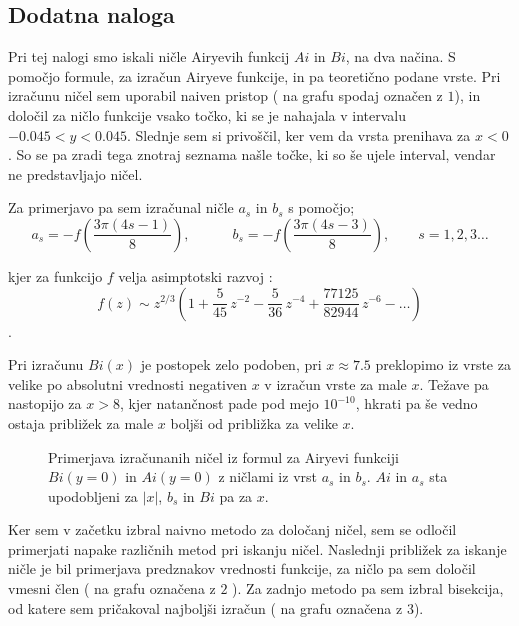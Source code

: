 \documentclass[11pt]{article}
\begin{document}
\subsection{Dodatna naloga}
Pri tej nalogi smo iskali ničle Airyevih funkcij $Ai$ in $Bi$, na dva načina. S pomočjo formule, za izračun Airyeve funkcije, in pa teoretično podane vrste. Pri izračunu ničel sem uporabil naiven pristop ( na grafu spodaj označen z $1$), in določil za ničlo funkcije vsako točko, ki se je nahajala v intervalu $-0.045 < y<0.045 $. Slednje sem si privoščil, ker vem da vrsta prenihava za $x<0$. So se pa zradi tega znotraj seznama našle točke, ki so še ujele interval, vendar ne predstavljajo ničel. 

Za primerjavo pa sem izračunal ničle $a_s$ in $b_s$ s pomočjo;
$$ a_s = -f \left ( \frac{3\pi ( 4s - 1)}{8} \right ), \quad \quad \quad  b_s =  -f \left ( \frac{3\pi ( 4s - 3)}{8} \right ) , \quad \quad s = 1,2,3 \dots$$

kjer za funkcijo $f$ velja asimptotski razvoj : 
$$ f(z) \sim z^{2/3}\left(  1+ \frac{5}{45}\,z^{-2} - \frac{5}{36}\,z^{-4} + \frac{77125}{82944}\,z^{-6} - \dots \right) $$.


Pri izračunu $Bi(x)$ je postopek zelo podoben, pri $ x \approx 7.5$  preklopimo iz vrste za velike po absolutni vrednosti negativen $x$   v izračun vrste za male $x$. Težave pa nastopijo za $x >8$, kjer natančnost pade pod mejo $ 10^{-10}$,  hkrati pa še vedno ostaja približek za male $x$ boljši od približka za velike $x$. 
\begin{figure}[h!]	 %
\begin{center}

\end{center}
\caption{Primerjava izračunanih ničel iz formul za Airyevi funkciji $Bi(y=0)$ in $Ai(y=0)$ z ničlami iz vrst $a_s$ in $b_s$. $Ai$ in $a_s$ sta upodobljeni za $|x|$, $b_s$ in $Bi$ pa za $x$. }

\end{figure}
Ker sem v začetku izbral naivno metodo za določanj ničel, sem se odločil primerjati napake različnih metod pri iskanju ničel. Naslednji približek za iskanje ničle je bil primerjava predznakov vrednosti funkcije, za ničlo pa sem določil vmesni člen ( na grafu označena z $2$ ). Za zadnjo metodo pa sem izbral bisekcija, od katere sem pričakoval najboljši izračun ( na grafu označena z $3$).
\end{document}
